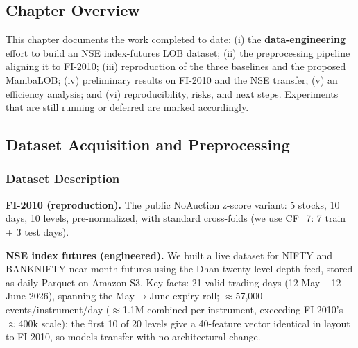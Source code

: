 \documentclass[11pt]{article}
\begin{document}
\subsection{Chapter Overview}
This chapter documents the work completed to date: (i) the \textbf{data-engineering} effort to build an NSE
index-futures LOB dataset; (ii) the preprocessing pipeline aligning it to FI-2010; (iii) reproduction of
the three baselines and the proposed MambaLOB; (iv) preliminary results on FI-2010 and the NSE transfer;
(v) an efficiency analysis; and (vi) reproducibility, risks, and next steps. Experiments that are still
running or deferred are marked accordingly.

\subsection{Dataset Acquisition and Preprocessing}

\subsubsection{Dataset Description}
\textbf{FI-2010 (reproduction).} The public NoAuction z-score variant: 5 stocks, 10 days, 10 levels,
pre-normalized, with standard cross-folds (we use CF\_7: 7 train + 3 test days).

\textbf{NSE index futures (engineered).} We built a live dataset for NIFTY and BANKNIFTY near-month futures
using the Dhan twenty-level depth feed, stored as daily Parquet on Amazon S3. Key facts: 21 valid trading
days (12 May -- 12 June 2026), spanning the May$\rightarrow$June expiry roll; $\approx$57{,}000
events/instrument/day ($\approx$1.1M combined per instrument, exceeding FI-2010's $\approx$400k scale); the
first 10 of 20 levels give a 40-feature vector identical in layout to FI-2010, so models transfer with no
architectural change.
\end{document}
